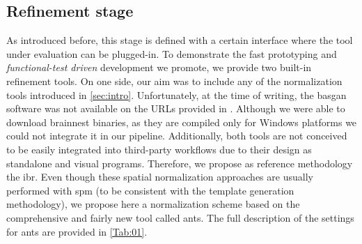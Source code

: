 \documentclass{frontiers}
\begin{document}
\subsection{Refinement stage}\label{sec:meth_refinement}
As introduced before, this stage is defined with a certain interface where the
  tool under evaluation can be plugged-in.
To demonstrate the fast prototyping and \emph{functional-test driven} development
  we promote, we provide two built-in refinement tools.
On one side, our aim was to include any of the normalization tools introduced in
  \autoref{sec:intro}.
Unfortunately, at the time of writing, the \gls*{basgan} software was not available
  on the URLs provided in \citep{calvini_basal_2007,skanjeti_assessing_2013}.
Although we were able to download \gls*{brainnest} binaries, as they are compiled 
  only for Windows platforms we could not integrate it in our pipeline.
Additionally, both tools are not conceived to be easily integrated into third-party
  workflows due to their design as standalone and visual programs.
Therefore, we propose as reference methodology the \acrfull*{ibr}.
Even though these spatial normalization approaches are usually performed with \gls*{spm}
  (to be consistent with the template generation methodology), we propose here 
  a normalization scheme based on the comprehensive and fairly new tool called \gls*{ants}.
The full description of the settings for \gls*{ants} are provided in \autoref{Tab:01}.
\end{document}
